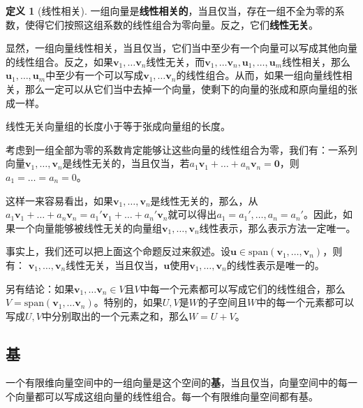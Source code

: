 \documentclass[UTF8]{ctexart}
\theoremstyle{definition}
\newtheorem{definition}{\textbf{定义}}[section]
\begin{document}
\begin{definition}[线性相关]
    \label{def:linear-correlation}
    一组向量是\textbf{线性相关的}，当且仅当，存在一组不全为零的系数，使得它们按照这组系数的线性组合为零向量。反之，它们\textbf{线性无关}。
\end{definition}

显然，一组向量线性相关，当且仅当，它们当中至少有一个向量可以写成其他向量的线性组合。反之，如果$\boldsymbol{v}_1, \ldots \boldsymbol{v}_n$线性无关，而$\boldsymbol{v}_1, \ldots \boldsymbol{v}_n, \boldsymbol{u}_1, \ldots, \boldsymbol{u}_m$线性相关，那么$\boldsymbol{u}_1, \ldots, \boldsymbol{u}_m$中至少有一个可以写成$\boldsymbol{v}_1, \ldots \boldsymbol{v}_n$的线性组合。从而，如果一组向量线性相关，那么一定可以从它们当中去掉一个向量，使剩下的向量的张成和原向量组的张成一样。

线性无关向量组的长度小于等于张成向量组的长度。

考虑到一组全部为零的系数肯定能够让这些向量的线性组合为零，我们有：一系列向量$\boldsymbol{v}_1, \ldots, \boldsymbol{v}_n$是线性无关的，当且仅当，若$a_1 \boldsymbol{v}_1 + \ldots + a_n \boldsymbol{v}_n = \boldsymbol{0}$，则$a_1 = \ldots = a_n=0$。

这样一来容易看出，如果$\boldsymbol{v}_1, \ldots, \boldsymbol{v}_n$是线性无关的，那么，从$a_1 \boldsymbol{v}_1 + \ldots + a_n \boldsymbol{v}_n = a_1' \boldsymbol{v}_1 + \ldots + a_n' \boldsymbol{v}_n$就可以得出$a_1 = a_1', \ldots, a_n = a_n'$。因此，如果一个向量能够被线性无关的向量组$\boldsymbol{v}_1, \ldots, \boldsymbol{v}_n$线性表示，那么表示方法一定唯一。

事实上，我们还可以把上面这个命题反过来叙述。设$\boldsymbol{u} \in \mathrm{span}(\boldsymbol{v}_1, \ldots, \boldsymbol{v}_n)$，则有：
$\boldsymbol{v}_1, \ldots, \boldsymbol{v}_n$线性无关，当且仅当，$\boldsymbol{u}$使用$\boldsymbol{v}_1, \ldots, \boldsymbol{v}_n$的线性表示是唯一的。

另有结论：如果$\boldsymbol{v}_1, \ldots \boldsymbol{v}_n \in V$且$V$中每一个元素都可以写成它们的线性组合，那么$V = \mathrm{span} (\boldsymbol{v}_1, \ldots \boldsymbol{v}_n)$。特别的，如果$U,V$是$W$的子空间且$W$中的每一个元素都可以写成$U,V$中分别取出的一个元素之和，那么$W=U+V$。

\hypertarget{ux57fa}{%
\subsection{基}\label{ux57fa}}

一个有限维向量空间中的一组向量是这个空间的\textbf{基}，当且仅当，向量空间中的每一个向量都可以写成这组向量的线性组合。每一个有限维向量空间都有基。
\end{document}
